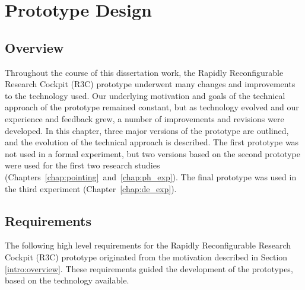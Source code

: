 \chapter{Prototype Design}
\label{chap:prototype}

\section{Overview}

Throughout the course of this dissertation work, the Rapidly Reconfigurable Research Cockpit (R3C) prototype underwent many changes and improvements to the technology used.
Our underlying motivation and goals of the technical approach of the prototype remained constant, but as technology evolved and our experience and feedback grew, a number of improvements and revisions were developed.
In this chapter, three major versions of the prototype are outlined, and the evolution of the technical approach is described.
The first prototype was not used in a formal experiment, but two versions based on the second prototype were used for the first two research studies (Chapters~\ref{chap:pointing}~and~\ref{chap:ph_exp}).
The final prototype was used in the third experiment (Chapter~\ref{chap:de_exp}).

\section{Requirements}

The following high level requirements for the Rapidly Reconfigurable Research Cockpit (R3C) prototype originated from the motivation described in Section \ref{intro:overview}.
These requirements guided the development of the prototypes, based on the technology available.

